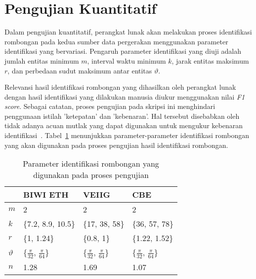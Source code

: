 \section{Pengujian Kuantitatif}
\label{sec:quantitative}

Dalam pengujian kuantitatif, perangkat lunak akan melakukan proses identifikasi rombongan pada kedua sumber data pergerakan menggunakan parameter identifikasi yang bervariasi. Pengaruh parameter identifikasi yang diuji adalah jumlah entitas minimum $m$, interval waktu minimum $k$, jarak entitas maksimum $r$, dan perbedaan sudut maksimum antar entitas $\vartheta$. 

Relevansi hasil identifikasi rombongan yang dihasilkan oleh perangkat lunak dengan hasil identifikasi yang dilakukan manusia diukur menggunakan nilai \textit{F1 score}. Sebagai catatan, proses pengujian pada skripsi ini menghindari penggunaan istilah 'ketepatan' dan 'kebenaran'. Hal tersebut disebabkan oleh tidak adanya acuan mutlak yang dapat digunakan untuk mengukur kebenaran identifikasi~\cite{wiratma:software}. Tabel~\ref{bab6:parameter} menunjukkan parameter-parameter identifikasi rombongan yang akan digunakan pada proses pengujian hasil identifikasi rombongan.

\begin{table}[h]
    \centering
    \caption[Parameter identifikasi rombongan]{Parameter identifikasi rombongan yang digunakan pada proses pengujian}
    \begin{tabular}{p{1cm} p{2.5cm} p{2.5cm} p{2.5cm}}
        \hline
        & \textbf{BIWI ETH} & \textbf{VEIIG} & \textbf{CBE} \\
        \hline
        $m$ & 2 & 2 & 2 \\
        $k$ & \{7.2, 8.9, 10.5\} & \{17, 38, 58\} & \{36, 57, 78\} \\
        $r$ & \{1, 1.24\} & \{0.8, 1\} & \{1.22, 1.52\} \\
        $\vartheta$ & \{$\frac{\pi}{32}$, $\frac{\pi}{64}$\} & \{$\frac{\pi}{32}$, $\frac{\pi}{64}$\} & \{$\frac{\pi}{32}$, $\frac{\pi}{64}$\} \\
        $n$ & 1.28 & 1.69 & 1.07 \\
        \hline
    \end{tabular}
    
    \label{bab6:parameter}
\end{table}

